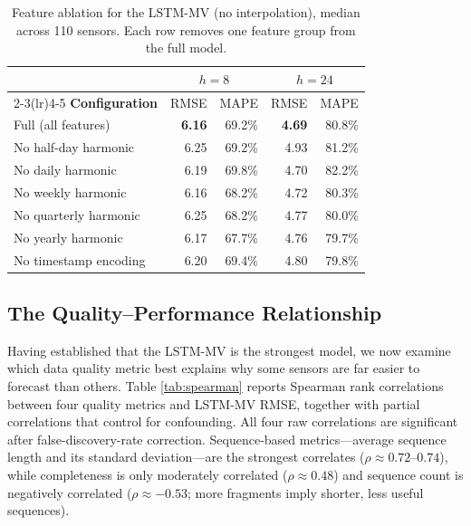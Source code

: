 \documentclass[journal,sensors,submit,pdftex,moreauthors]{Definitions/mdpi}
\begin{document}
\begin{table}[htbp]
    \caption{Feature ablation for the LSTM-MV (no interpolation), median across 110 sensors. Each row removes one feature group from the full model.}
    \label{tab:ablation}
    \begin{tabular}{@{}lrrrr@{}}
        \toprule
        & \multicolumn{2}{c}{$h=8$} & \multicolumn{2}{c}{$h=24$} \\
        \cmidrule(lr){2-3}\cmidrule(lr){4-5}
        \textbf{Configuration} & RMSE & MAPE & RMSE & MAPE \\
        \midrule
        Full (all features)   & \textbf{6.16} & 69.2\% & \textbf{4.69} & 80.8\% \\
        No half-day harmonic  & 6.25 & 69.2\% & 4.93 & 81.2\% \\
        No daily harmonic     & 6.19 & 69.8\% & 4.70 & 82.2\% \\
        No weekly harmonic    & 6.16 & 68.2\% & 4.72 & 80.3\% \\
        No quarterly harmonic & 6.25 & 68.2\% & 4.77 & 80.0\% \\
        No yearly harmonic    & 6.17 & 67.7\% & 4.76 & 79.7\% \\
        No timestamp encoding & 6.20 & 69.4\% & 4.80 & 79.8\% \\
        \bottomrule
    \end{tabular}
\end{table}

\subsection{The Quality--Performance Relationship}

Having established that the LSTM-MV is the strongest model, we now examine which data quality metric best explains why some sensors are far easier to forecast than others. Table \ref{tab:spearman} reports Spearman rank correlations between four quality metrics and LSTM-MV RMSE, together with partial correlations that control for confounding. All four raw correlations are significant after false-discovery-rate correction. Sequence-based metrics---average sequence length and its standard deviation---are the strongest correlates ($\rho \approx 0.72$--$0.74$), while completeness is only moderately correlated ($\rho \approx 0.48$) and sequence count is negatively correlated ($\rho \approx -0.53$; more fragments imply shorter, less useful sequences).
\end{document}
